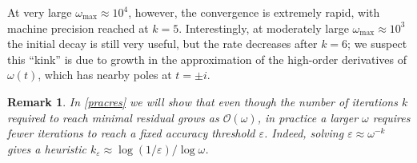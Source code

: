 \documentclass[10pt]{article}
\newcommand{\bigO}{{\mathcal O}}
\newtheorem{rmk}[thm]{Remark}
\newcommand{\om}{\omega}
\begin{document}
At very large $\om_{\text{max}} \approx 10^4$, however, the
convergence is extremely rapid, with machine precision reached at $k=5$.
Interestingly, at moderately large $\om_{\text{max}} \approx 10^3$ the initial decay is
still very useful, but the rate decreases after $k=6$; we
suspect this ``kink'' is due to growth in the
approximation of the high-order derivatives of $\om(t)$, which has nearby
poles at $t=\pm i$.
\begin{rmk}\label{fewer}  
In \cref{pracres} we will show that even though the number of iterations $k$
required to reach minimal residual grows as $\bigO(\om)$, in
practice a larger $\om$ requires \emph{fewer} iterations to reach a fixed
accuracy threshold $\varepsilon$.
Indeed, solving $\varepsilon\approx \om^{-k}$ gives a heuristic
$k_\varepsilon \approx \log(1/\varepsilon)/\log \om$.
\end{rmk}                    
\end{document}
